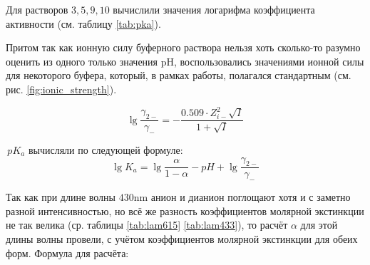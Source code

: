 \documentclass{article}
\begin{document}
	\begin{table}[htbp]
		\centering
		\caption{Данные для индикатора при $\lambda = 433\unit{\nano\meter}$}
		\label{tab:lam433}
	\end{table}
	
	Для растворов $3, 5, 9, 10$ вычислили значения логарифма коэффициента активности (см. таблицу \ref{tab:pka}).
	
	Притом так как ионную силу буферного раствора нельзя хоть сколько-то разумно оценить из одного только значения pH, воспользовались значениями ионной силы для некоторого буфера, который, в рамках работы, полагался стандартным (см. рис. \ref{fig:ionic_strength}).
	
	$$\lg{\frac{\gamma_{2-}}{\gamma_-}} = - \frac{0.509\cdot Z_{i-}^2\sqrt{I}}{1 + \sqrt{I}}$$
	
	$\,pK_a$ вычисляли по следующей формуле:
	$$\lg{K_a}=\lg{\frac{\alpha}{1-\alpha}}- pH + \lg{\frac{\gamma_{2-}}{\gamma_-}}$$
	
	Так как при длине волны $430\unit{\nano\meter}$ анион и дианион поглощают хотя и с заметно разной интенсивностью, но всё же разность коэффициентов молярной экстинкции не так велика (ср. таблицы \ref{tab:lam615} \ref{tab:lam433}), то расчёт $\alpha$ для этой длины волны провели, с учётом коэффициентов молярной экстинкции для обеих форм. Формула для расчёта:
	
\end{document}
